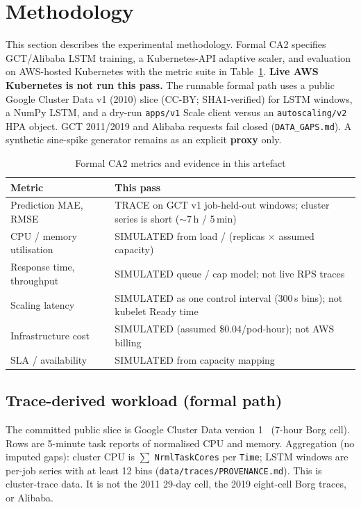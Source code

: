 
\section{Methodology}
\label{sec:Methodology}

This section describes the experimental methodology. Formal CA2 specifies GCT/Alibaba LSTM training, a Kubernetes-API adaptive scaler, and evaluation on AWS-hosted Kubernetes with the metric suite in Table~\ref{tab:formal-metrics-intent}. \textbf{Live AWS Kubernetes is not run this pass.} The runnable formal path uses a public Google Cluster Data v1 (2010) slice (CC-BY; SHA1-verified) for LSTM windows, a NumPy LSTM, and a dry-run \texttt{apps/v1} Scale client versus an \texttt{autoscaling/v2} HPA object. GCT 2011/2019 and Alibaba requests fail closed (\texttt{DATA\_GAPS.md}). A synthetic sine-spike generator remains as an explicit \textbf{proxy} only.

\begin{table}[htp]
\centering
\caption{Formal CA2 metrics and evidence in this artefact}
\label{tab:formal-metrics-intent}
\begin{tabular}{lp{8cm}}
\hline
\textbf{Metric} & \textbf{This pass} \\
\hline
Prediction MAE, RMSE & TRACE on GCT v1 job-held-out windows; cluster series is short ($\sim$7\,h / 5\,min) \\
CPU / memory utilisation & SIMULATED from load / (replicas $\times$ assumed capacity) \\
Response time, throughput & SIMULATED queue / cap model; not live RPS traces \\
Scaling latency & SIMULATED as one control interval (300\,s bins); not kubelet Ready time \\
Infrastructure cost & SIMULATED (assumed \$0.04/pod-hour); not AWS billing \\
SLA / availability & SIMULATED from capacity mapping \\
\hline
\end{tabular}
\end{table}

\subsection{Trace-derived workload (formal path)}

The committed public slice is Google Cluster Data version 1~\cite{GCT2010} (7-hour Borg cell). Rows are 5-minute task reports of normalised CPU and memory. Aggregation (no imputed gaps): cluster CPU is $\sum$ \texttt{NrmlTaskCores} per \texttt{Time}; LSTM windows are per-job series with at least 12 bins (\texttt{data/traces/PROVENANCE.md}). This is cluster-trace data. It is not the 2011 29-day cell, the 2019 eight-cell Borg traces, or Alibaba.

